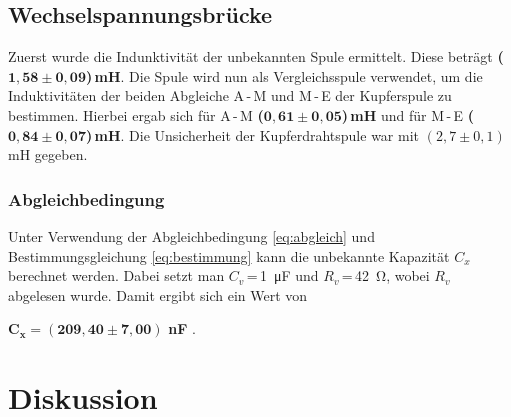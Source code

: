 \documentclass[a4paper,usenatbib]{aspdoc}
\begin{document}
        
        \subsection{Wechselspannungsbrücke}\label{subsec:result_wechsel}
            Zuerst wurde die Indunktivität der unbekannten Spule ermittelt. Diese beträgt \textbf{(}$\mathbf{1,58 \pm 0,09}$\textbf{)\,mH}. Die Spule wird nun als Vergleichsspule verwendet, um die Induktivitäten der beiden Abgleiche A\,-\,M und M\,-\,E der Kupferspule zu bestimmen. Hierbei ergab sich für A\,-\,M \textbf{(}$\mathbf{0,61 \pm 0,05}$\textbf{)\,mH} und für M\,-\,E \textbf{(}$\mathbf{0,84 \pm 0,07}$\textbf{)\,mH}. Die Unsicherheit der Kupferdrahtspule war mit $(2,7 \pm 0,1)\,$mH gegeben.
            
            \subsubsection{Abgleichbedingung}
                Unter Verwendung der Abgleichbedingung \ref{eq:abgleich} und Bestimmungsgleichung \ref{eq:bestimmung} kann die unbekannte Kapazität $C_x$ berechnet werden. Dabei setzt man $C_v$\,=\,\SI{1}{\micro\farad} und $R_v$\,=\,\SI{42}{\ohm}, wobei $R_v$ abgelesen wurde. Damit ergibt sich ein Wert von
                \begin{center}
                    $\mathbf{C_x = (209,40 \pm 7,00)}$ \textbf{nF} .
                \end{center}
            
    \section{Diskussion}\label{sec:discussion}
\end{document}
